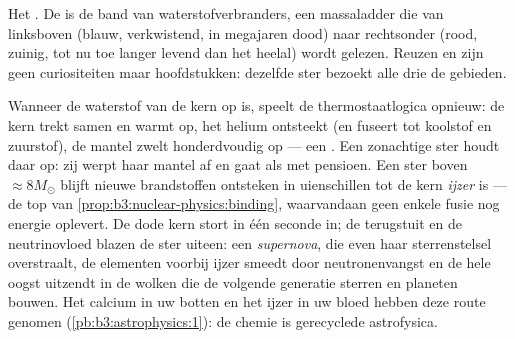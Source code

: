 \begin{omfigure}

{\small Het . De  is de band van
waterstofverbranders, een massaladder die van linksboven (blauw,
verkwistend, in megajaren dood) naar rechtsonder (rood, zuinig,
tot nu toe langer levend dan het heelal) wordt gelezen. Reuzen en  zijn geen
curiositeiten maar hoofdstukken: dezelfde ster bezoekt alle drie de gebieden.}
\end{omfigure}

\begin{remark}\label{rem:b3:astrophysics:evolution}
Wanneer de waterstof van de kern op is, speelt de thermostaatlogica opnieuw:
de kern trekt samen en warmt op, het helium ontsteekt (en fuseert tot koolstof
en zuurstof), de mantel zwelt honderdvoudig op --- een .
Een zonachtige ster houdt daar op: zij werpt haar mantel af en gaat
als  met pensioen. Een ster boven $\approx8M_\odot$ blijft
nieuwe brandstoffen ontsteken in uienschillen tot de kern \emph{ijzer} is ---
de top van \cref{prop:b3:nuclear-physics:binding}, waarvandaan geen enkele
fusie nog energie oplevert. De dode kern stort in één seconde in; de
terugstuit en de neutrinovloed blazen de ster uiteen: een
\emph{supernova}, die even haar sterrenstelsel overstraalt, de
elementen voorbij ijzer smeedt door neutronenvangst en de hele oogst
uitzendt in de wolken die de volgende generatie sterren en
planeten bouwen. Het calcium in uw botten en het ijzer in uw bloed
hebben deze route genomen (\cref{pb:b3:astrophysics:1}): de chemie is
gerecyclede astrofysica.
\end{remark}

